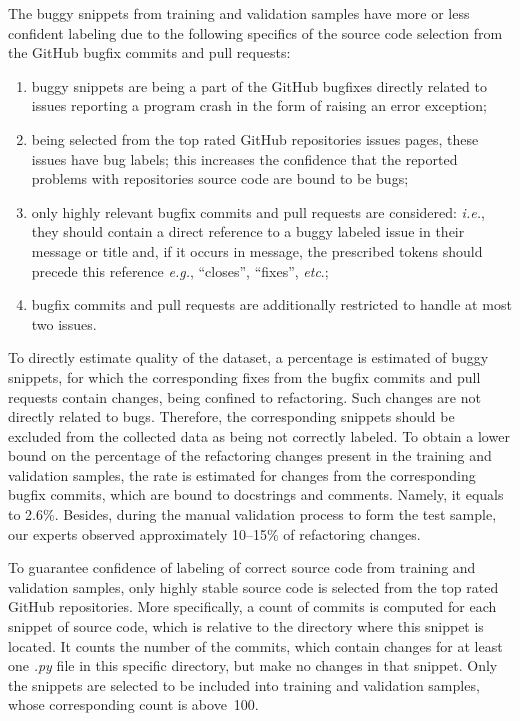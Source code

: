 \documentclass[10pt,conference]{IEEEtran}
\begin{document}
The buggy snippets from training and validation samples have more or less confident labeling due to the following specifics of the source code selection from
the GitHub bugfix commits and pull requests:
\begin{enumerate}
\item buggy snippets are being a part of the GitHub bugfixes directly related to issues reporting a program crash in the form of raising an error exception;

\item being selected from the top rated GitHub repositories issues pages, these issues have bug labels; this increases the confidence that the reported problems with repositories source code are bound to be bugs;

\item only highly relevant bugfix commits and pull requests are considered: \textit{i.e.}, they should contain a direct reference to a buggy labeled issue in their message or title and, if it occurs in message, the prescribed tokens should precede this reference \textit{e.g.}, ``closes'', ``fixes'', \textit{etc}.;

\item bugfix commits and pull requests are additionally restricted to handle at most two issues.
\end{enumerate}

To directly estimate quality of the dataset, a percentage is estimated of buggy snippets, for which the corresponding fixes from the bugfix commits and pull requests contain changes, being confined to refactoring.
Such changes are not directly related to bugs. Therefore, the corresponding snippets should be excluded from the collected data as being not correctly labeled.
To obtain a lower bound on the percentage of the refactoring changes present in the training and validation samples,
the rate is estimated for changes from the corresponding bugfix commits, which are bound to docstrings and comments. Namely, it equals to 2.6\%.
Besides, during the manual validation process to form the test sample, our experts observed
approximately 10--15\% of refactoring changes.

To guarantee confidence of labeling of correct source code from training and validation samples, only highly stable source code is selected from the top rated GitHub repositories.
More specifically, a count of commits is computed for each snippet of source code,
which is relative to the directory where this snippet is located. It counts the number of the commits, which contain changes for at least one \textit{.py} file in this specific
directory, but make no changes in that snippet. Only the snippets are selected to be included into training and validation samples, whose corresponding count is above~100.
\end{document}
